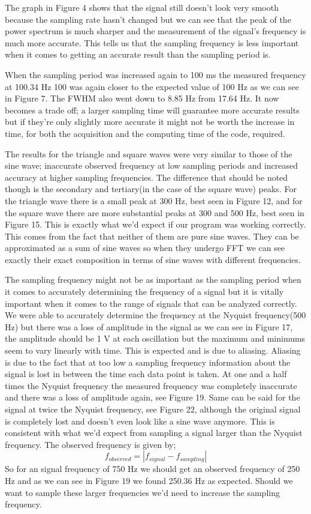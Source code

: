 \documentclass{article}
\begin{document}
The graph in Figure 4 shows that the signal still doesn't look very smooth because the sampling rate hasn't changed but we can see that the peak of the power spectrum is much sharper and the measurement of the signal's frequency is much more accurate.  This tells us that the sampling frequency is less important when it comes to getting an accurate result than the sampling period is.

When the sampling period was increased again to 100 ms the measured frequency at 100.34 Hz 100  was again closer to the expected value of 100 Hz as we can see in Figure 7.  The FWHM also went down to 8.85 Hz from 17.64 Hz.  It now becomes a trade off;  a larger sampling time will guarantee more accurate results but if they're only slightly more accurate it might not be worth the increase in time, for both the acquisition and the computing time of the code, required. 

The results for the triangle and square waves were very similar to those of the sine wave; inaccurate observed frequency at low sampling periods and increased accuracy at higher sampling frequencies.  The difference that should be noted though is the secondary and tertiary(in the case of the square wave) peaks.  For the triangle wave there is a small peak at 300 Hz, best seen in Figure 12,  and for the square wave there are more substantial peaks at 300 and 500 Hz, best seen in Figure 15.  This is exactly what we'd expect if our program was working correctly.  This comes from the fact that neither of them are pure sine waves.  They can be approximated as a sum of sine waves so when they undergo FFT we can see exactly their exact composition in terms of sine waves with different frequencies.  

The sampling frequency might not be as important as the sampling period when it comes to accurately determining the frequency of a signal but it is vitally important when it comes to the range of signals that can be analyzed correctly.  We were able to accurately determine the frequency at the Nyquist frequency(500 Hz) but there was a loss of amplitude in the signal as we can see in Figure 17, the amplitude should be 1 V at each oscillation but the maximum and minimums seem to vary linearly with time.  This is expected and is due to aliasing.  Aliasing is due to the fact that at too low a sampling frequency information about the signal is lost in between the time each data point is taken.  At one and a half times the Nyquist frequency the measured frequency was completely inaccurate and there was a loss of amplitude again, see Figure 19.  Same can be said for the signal at twice the Nyquist frequency, see Figure 22, although the original signal is completely lost and doesn't even look like a sine wave anymore.  This is consistent with what we'd expect from sampling a signal larger than the Nyquist frequency.  The observed frequency is given by;
$$f_{observed}=|f_{signal}-f_{sampling}|$$
So for an signal frequency of 750 Hz we should get an observed frequency of 250 Hz and as we can see in Figure 19 we found 250.36 Hz as expected.
Should we want to sample these larger frequencies we'd need to increase the sampling frequency.   
\end{document}
